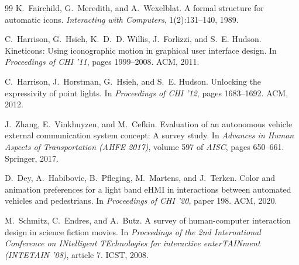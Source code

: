 \documentclass[11pt]{article}
\begin{document}
\begin{thebibliography}{99}
K.~Fairchild, G.~Meredith, and A.~Wexelblat.
A formal structure for automatic icons.
\emph{Interacting with Computers}, 1(2):131--140, 1989.

C.~Harrison, G.~Hsieh, K.~D.~D. Willis, J.~Forlizzi, and S.~E. Hudson.
Kineticons: Using iconographic motion in graphical user interface
design.
In \emph{Proceedings of CHI '11}, pages 1999--2008. ACM, 2011.

C.~Harrison, J.~Horstman, G.~Hsieh, and S.~E. Hudson.
Unlocking the expressivity of point lights.
In \emph{Proceedings of CHI '12}, pages 1683--1692. ACM, 2012.

J.~Zhang, E.~Vinkhuyzen, and M.~Cefkin.
Evaluation of an autonomous vehicle external communication system
concept: A survey study.
In \emph{Advances in Human Aspects of Transportation (AHFE 2017)},
volume 597 of \emph{AISC}, pages 650--661. Springer, 2017.

D.~Dey, A.~Habibovic, B.~Pfleging, M.~Martens, and J.~Terken.
Color and animation preferences for a light band eHMI in interactions
between automated vehicles and pedestrians.
In \emph{Proceedings of CHI '20}, paper 198. ACM, 2020.

M.~Schmitz, C.~Endres, and A.~Butz.
A survey of human-computer interaction design in science fiction movies.
In \emph{Proceedings of the 2nd International Conference on INtelligent
TEchnologies for interactive enterTAINment (INTETAIN '08)}, article 7.
ICST, 2008.

\end{thebibliography}
\end{document}

